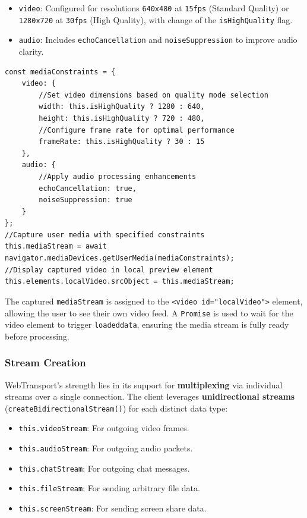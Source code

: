 \begin{itemize}
    \item \texttt{video}: Configured for resolutions \texttt{640x480} at \texttt{15fps} (Standard Quality) or \texttt{1280x720} at \texttt{30fps} (High Quality), with change of the \texttt{isHighQuality} flag.
    \item \texttt{audio}: Includes \texttt{echoCancellation} and \texttt{noiseSuppression} to improve audio clarity.
\end{itemize}

\begin{lstlisting}[breaklines=true,basicstyle=\small\ttfamily,frame=single]
const mediaConstraints = {
    video: {
        //Set video dimensions based on quality mode selection
        width: this.isHighQuality ? 1280 : 640,
        height: this.isHighQuality ? 720 : 480,
        //Configure frame rate for optimal performance
        frameRate: this.isHighQuality ? 30 : 15
    },
    audio: {
        //Apply audio processing enhancements
        echoCancellation: true,
        noiseSuppression: true
    }
};
//Capture user media with specified constraints
this.mediaStream = await navigator.mediaDevices.getUserMedia(mediaConstraints);
//Display captured video in local preview element
this.elements.localVideo.srcObject = this.mediaStream;
\end{lstlisting}

The captured \texttt{mediaStream} is assigned to the \texttt{<video id="localVideo">} element, allowing the user to see their own video feed. A \texttt{Promise} is used to wait for the video element to trigger \texttt{loadeddata}, ensuring the media stream is fully ready before processing.

\subsubsection{Stream Creation}
WebTransport's strength lies in its support for \textbf{multiplexing} via individual streams over a single connection. The client leverages \textbf{unidirectional streams} (\texttt{create\allowbreak{}Bidirectional\allowbreak{}Stream()}) for each distinct data type:

\begin{itemize}
    \item \texttt{this.videoStream}: For outgoing video frames.
    \item \texttt{this.audioStream}: For outgoing audio packets.
    \item \texttt{this.chatStream}: For outgoing chat messages.
    \item \texttt{this.fileStream}: For sending arbitrary file data.
    \item \texttt{this.screenStream}: For sending screen share data.
\end{itemize}

